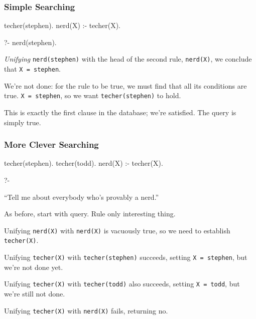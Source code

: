 \documentclass{plt}
\begin{document}
\begin{frame}[fragile]
  \frametitle{Simple Searching}

\begin{prolog}
techer(stephen).
nerd(X) :- techer(X).
\end{prolog}

\begin{minipage}{0.3\textwidth}
\begin{interactive}
?- nerd(stephen).
\end{interactive}
\end{minipage}

\emph{Unifying} \texttt{nerd(stephen)} with the head of the second
rule, \texttt{nerd(X)}, we conclude that \texttt{X = stephen}.

We're not done: for the rule to be true, we must find that all its
conditions are true.  \texttt{X = stephen}, so we want
\texttt{techer(stephen)} to hold.

This is exactly the first clause in the database; we're satisfied.
The query is simply true.

\end{frame}

\begin{frame}[fragile]
  \frametitle{More Clever Searching}

\begin{prolog}
techer(stephen).
techer(todd).
nerd(X) :- techer(X).
\end{prolog}

\begin{minipage}{0.3\textwidth}
\begin{interactive}
?- 
\end{interactive}
\end{minipage}

``Tell me about everybody who's provably a nerd.''

As before, start with query.  Rule only interesting thing.

Unifying \texttt{nerd(X)} with \texttt{nerd(X)} is vacuously true, so
we need to establish \texttt{techer(X)}.

Unifying \texttt{techer(X)} with \texttt{techer(stephen)} succeeds,
setting \texttt{X = stephen}, but we're not done yet.

Unifying \texttt{techer(X)} with \texttt{techer(todd)} also succeeds,
setting \texttt{X = todd}, but we're still not done.

Unifying \texttt{techer(X)} with \texttt{nerd(X)} fails, returning no.

\end{frame}
\end{document}

